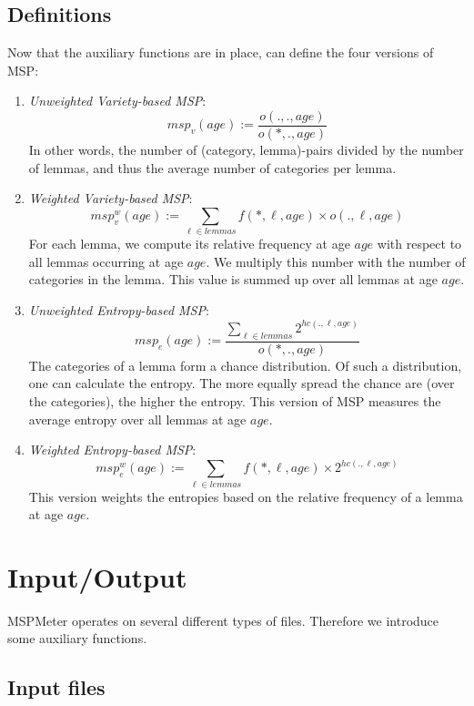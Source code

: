 \documentclass{article}
\newcommand{\age}{\mathit{age}}
\newcommand{\hc}{\mathit{hc}}
\newcommand{\msp}{\mathit{msp}}
\newcommand{\lemmas}{\mathit{lemmas}}
\begin{document}
\subsection{Definitions}

Now that the auxiliary functions are in place, can define the four versions of MSP:
\begin{enumerate}
\item \emph{Unweighted Variety-based MSP}: 
$$\msp_{v}(\age) := \frac{o(., ., \age)}{o(*, ., \age)}$$
In other words, the number of (category, lemma)-pairs divided by the number of lemmas, and thus the average number of categories per lemma.

\item \emph{Weighted Variety-based MSP}: 
$$\msp_{v}^w(\age) := \sum_{\ell \in \lemmas} f(*, \ell, \age) \times o(., \ell, \age)$$
For each lemma, we compute its relative frequency at age $\age$ with respect to all lemmas occurring at age $\age$. We multiply this number with the number of categories in the lemma. This value is summed up over all lemmas at age $\age$.

\item \emph{Unweighted Entropy-based MSP}:
$$\msp_e(\age) := \frac{\sum_{\ell \in \lemmas} 2^{\hc(., \ell, \age)}}{o(*, ., \age)}$$
The categories of a lemma form a chance distribution. Of such a distribution, one can calculate the entropy. The more equally spread the chance are (over the categories), the higher the entropy. This version of MSP measures the average entropy over all lemmas at age $\age$.

\item \emph{Weighted Entropy-based MSP}:
$$\msp_e^w(\age) := \sum_{\ell \in \lemmas} f(*, \ell, \age) \times 2^{hc(., \ell, \age)}$$
This version weights the entropies based on the relative frequency of a lemma at age $\age$.
\end{enumerate}



\section{Input/Output}

MSPMeter operates on several different types of files. Therefore we introduce some auxiliary functions. 



\subsection{Input files}
\end{document}
